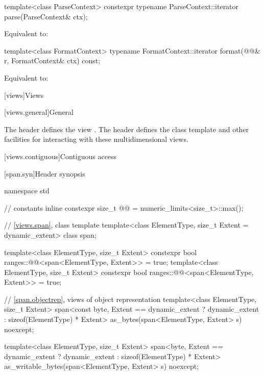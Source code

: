 %
\begin{itemdecl}
template<class ParseContext>
  constexpr typename ParseContext::iterator
    parse(ParseContext& ctx);
\end{itemdecl}

\begin{itemdescr}
\pnum
\effects
Equivalent to: 
\end{itemdescr}

%
\begin{itemdecl}
template<class FormatContext>
  typename FormatContext::iterator
    format(@@& r, FormatContext& ctx) const;
\end{itemdecl}

\begin{itemdescr}
\pnum
\effects
Equivalent to: 
\end{itemdescr}

[views]{Views}

[views.general]{General}

\pnum
The header  defines the view .
The header  defines the class template  and
other facilities for interacting with these multidimensional views.

[views.contiguous]{Contiguous access}

[span.syn]{Header  synopsis}%

%
\begin{codeblock}
namespace std {
  // constants
  inline constexpr size_t @@ = numeric_limits<size_t>::max();

  // \ref{views.span}, class template 
  template<class ElementType, size_t Extent = dynamic_extent>
    class span;

  template<class ElementType, size_t Extent>
    constexpr bool ranges::@@<span<ElementType, Extent>> = true;
  template<class ElementType, size_t Extent>
    constexpr bool ranges::@@<span<ElementType, Extent>> = true;

  // \ref{span.objectrep}, views of object representation
  template<class ElementType, size_t Extent>
    span<const byte, Extent == dynamic_extent ? dynamic_extent : sizeof(ElementType) * Extent>
      as_bytes(span<ElementType, Extent> s) noexcept;

  template<class ElementType, size_t Extent>
    span<byte, Extent == dynamic_extent ? dynamic_extent : sizeof(ElementType) * Extent>
      as_writable_bytes(span<ElementType, Extent> s) noexcept;
}
\end{codeblock}

